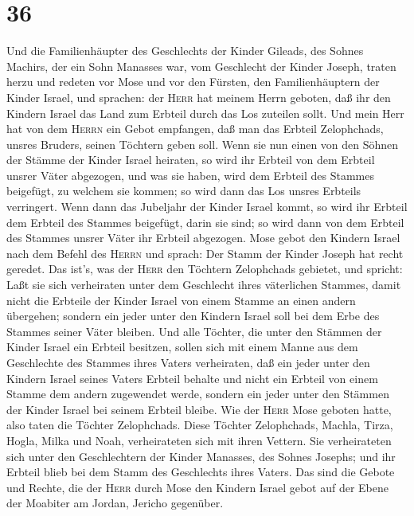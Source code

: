 \hypertarget{section-35}{%
\section{36}\label{section-35}}

 Und die Familienhäupter des Geschlechts der Kinder
Gileads, des Sohnes Machirs, der ein Sohn Manasses war, vom Geschlecht
der Kinder Joseph, traten herzu und redeten vor Mose und vor den
Fürsten, den Familienhäuptern der Kinder Israel, und sprachen:
 der \textsc{Herr} hat meinem Herrn geboten, daß ihr den
Kindern Israel das Land zum Erbteil durch das Los zuteilen sollt. Und
mein Herr hat von dem \textsc{Herrn} ein Gebot empfangen, daß man das
Erbteil Zelophchads, unsres Bruders, seinen Töchtern geben soll.
 Wenn sie nun einen von den Söhnen der Stämme der Kinder
Israel heiraten, so wird ihr Erbteil von dem Erbteil unsrer Väter
abgezogen, und was sie haben, wird dem Erbteil des Stammes beigefügt, zu
welchem sie kommen; so wird dann das Los unsres Erbteils verringert.
 Wenn dann das Jubeljahr der Kinder Israel kommt, so wird
ihr Erbteil dem Erbteil des Stammes beigefügt, darin sie sind; so wird
dann von dem Erbteil des Stammes unsrer Väter ihr Erbteil abgezogen.
 Mose gebot den Kindern Israel nach dem Befehl des
\textsc{Herrn} und sprach: Der Stamm der Kinder Joseph hat recht
geredet.  Das ist's, was der \textsc{Herr} den Töchtern
Zelophchads gebietet, und spricht: Laßt sie sich verheiraten unter dem
Geschlecht ihres väterlichen Stammes,  damit nicht die
Erbteile der Kinder Israel von einem Stamme an einen andern übergehen;
sondern ein jeder unter den Kindern Israel soll bei dem Erbe des Stammes
seiner Väter bleiben.  Und alle Töchter, die unter den
Stämmen der Kinder Israel ein Erbteil besitzen, sollen sich mit einem
Manne aus dem Geschlechte des Stammes ihres Vaters verheiraten, daß ein
jeder unter den Kindern Israel seines Vaters Erbteil behalte
 und nicht ein Erbteil von einem Stamme dem andern
zugewendet werde, sondern ein jeder unter den Stämmen der Kinder Israel
bei seinem Erbteil bleibe.  Wie der \textsc{Herr} Mose
geboten hatte, also taten die Töchter Zelophchads.  Diese
Töchter Zelophchads, Machla, Tirza, Hogla, Milka und Noah, verheirateten
sich mit ihren Vettern.  Sie verheirateten sich unter den
Geschlechtern der Kinder Manasses, des Sohnes Josephs; und ihr Erbteil
blieb bei dem Stamm des Geschlechts ihres Vaters.  Das
sind die Gebote und Rechte, die der \textsc{Herr} durch Mose den Kindern
Israel gebot auf der Ebene der Moabiter am Jordan, Jericho gegenüber.
